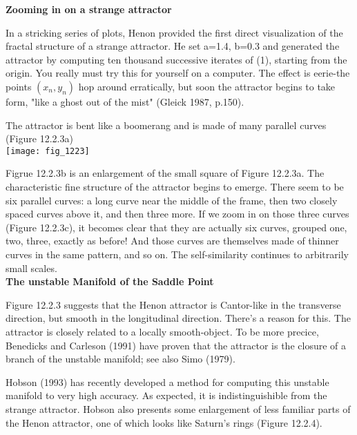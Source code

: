 \documentclass{article}
\newcommand\tab[1][1cm]{\hspace*{#1}}
\begin{document}
\textbf {Zooming in on a strange attractor} \\ \tab

In a stricking series of plots, Henon provided the first direct visualization of the fractal structure of a strange attractor. He set a=1.4, b=0.3 and generated the attractor by computing ten thousand successive iterates of (1), starting from the origin. You really must try this for yourself on a computer. The effect is eerie-the points $(x_{n},y_{n})$ hop around erratically, but soon the attractor begins to take form, "like a ghost out of the mist" (Gleick 1987, p.150). \\ \tab

The attractor is bent like a boomerang and is made of many parallel curves (Figure 12.2.3a) \\

\texttt{[image: fig\_1223]}

Figrue 12.2.3b is an enlargement of the small square of Figure 12.2.3a. The characteristic fine structure of the attractor begins to emerge. There seem to be six parallel curves: a long curve near the middle of the frame, then two closely spaced curves above it, and then three more. If we zoom in on those three curves (Figure 12.2.3c), it becomes clear that they are actually six curves, grouped one, two, three, exactly as before! And those curves are themselves made of thinner curves in the same pattern, and so on. The self-similarity continues to arbitrarily small scales. \\

\textbf {The unstable Manifold of the Saddle Point} \\ \tab

Figure 12.2.3 suggests that the Henon attractor is Cantor-like in the transverse direction, but smooth in the longitudinal direction. There's a reason for this. The attractor is closely related to a locally smooth-object. To be more precice, Benedicks and Carleson (1991) have proven that the attractor is the closure of a branch of the unstable manifold; see also Simo (1979). \\ \tab

Hobson (1993) has recently developed a method for computing this unstable manifold to very high accuracy. As expected, it is indistinguishible from the strange attractor. Hobson also presents some enlargement of less familiar parts of the Henon attractor, one of which looks like Saturn's rings (Figure 12.2.4). \\
\end{document}
